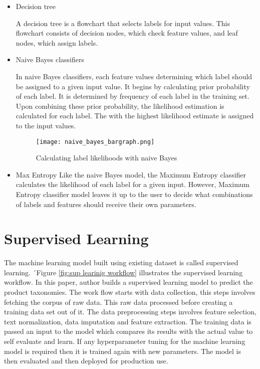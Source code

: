 \begin{itemize}
    \item Decision  tree
    
    A decision tree is a flowchart that selects labels for input values. This flowchart consists of decision nodes, which check feature values, and leaf nodes, which assign labels. 

    \item Naive Bayes classifiers
    
    In naive Bayes classifiers, each feature values determining which label should be assigned to a given input value. It begins by calculating prior probability of each label. It is determined by frequency of each label in the training set. Upon combining these prior probability, the likelihood estimation is calculated for each label. The with the highest likelihood estimate is assigned to the input values.


    \begin{figure}[H]
        \centering    
        \texttt{[image: naive\_bayes\_bargraph.png]}
        \caption{Calculating label likelihoods with naive Bayes \parencite{BirdKleinLoper09}}
        \label{fig:Calculating label likelihoods with naive Bayes}
    \end{figure}

    \item Max Entropy
    Like the naive Bayes model, the Maximum Entropy classifier calculates the likelihood of each label for a given input.
    However, Maximum Entropy classifier model leaves it up to the user to decide what combinations of labels and features should receive their own parameters.

\end{itemize}



\section{Supervised Learning}

The machine learning model built using existing dataset is called supervised learning. ´Figure \ref{fig:sup learinig workflow} illustrates the supervised learning workflow. In this paper, author builds a supervised learning model to predict the product taxonomies. The work flow starts with data collection, this steps involves fetching the corpus of raw data. This raw data processed before creating a training data set out of it. The data preprocessing steps involves feature selection, text normalization, data imputation and feature extraction. The training data is passed an input to the model which compares its results with the actual value to self evaluate and learn. If any hyperparameter tuning for the machine learning model is required then it is trained again with new parameters. The model is then evaluated and then deployed for production use.


